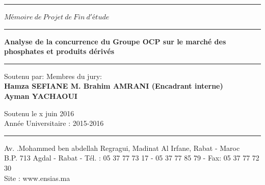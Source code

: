 \begin{titlepage}
\begin{center}
	\rule{\linewidth}{1pt}
	
	\vspace{4.65cm}
	
	\huge $Mémoire \ de \ Projet \ de \ Fin \ d'étude$
	
	\vspace{1.5cm} 
	
	\rule{\linewidth}{2pt}
	
	\Large
	\textbf{Analyse de la concurrence du Groupe OCP sur le marché des phosphates et produits dérivés}
	
	\rule{\linewidth}{2pt}
	
	\vspace{1.5cm}
	
	\begin{flushleft}
	
	\normalsize{Soutenu par:} \hfill Membres du jury: \\
	\vspace{10pt}
	\textbf{Hamza SEFIANE \hfill M. Brahim AMRANI (Encadrant interne)} \\
	\textbf{Ayman YACHAOUI \hfill}
	
	\end{flushleft}
	
	\begin{center}
	
			\vspace{72pt}
			\normalsize{Soutenu le x juin 2016} \\
			\vspace{39pt}
			Année Universitaire : 2015-2016
			\vspace{6pt}
			
			\rule{\linewidth}{1pt}
			\footnotesize Av. .Mohammed ben abdellah Regragui, Madinat Al Irfane, Rabat - Maroc\\
			B.P. 713 Agdal - Rabat - Tél. : 05 37 77 73 17 - 05 37 77 85 79 - Fax: 05 37 77 72 30\\
			Site : www.ensias.ma 
	
	\end{center}
	
\end{center}

\end{titlepage}